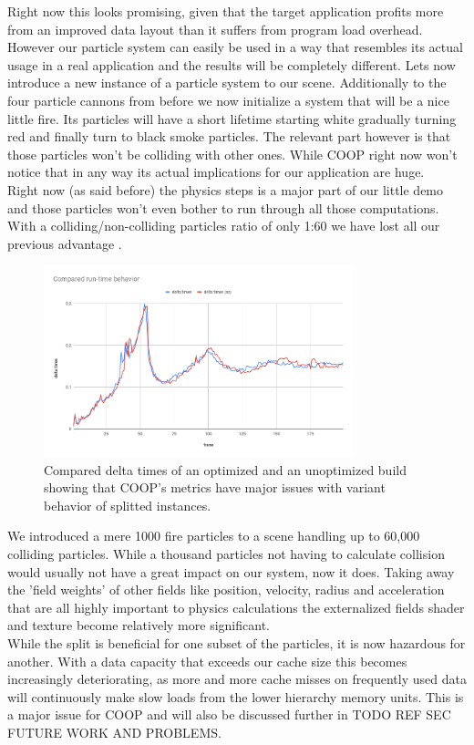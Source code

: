 Right now this looks promising, given that the target application profits more from an improved data layout than it suffers from program load overhead. However our particle system can easily be used in a way that resembles its actual usage in a real application and the results will be completely different. Lets now introduce a new instance of a particle system to our scene. Additionally to the four particle cannons from before we now initialize a system that will be a nice little fire. Its particles will have a short lifetime starting white gradually turning red and finally turn to black smoke particles. The relevant part however is that those particles won't be colliding with other ones. While COOP right now won't notice that in any way its actual implications for our application are huge.\\
Right now (as said before) the physics steps is a major part of our little demo and those particles won't even bother to run through all those computations. With a colliding/non-colliding particles ratio of only 1:60 we have lost all our previous advantage .
\begin{figure}[!htbp]
	\centering
	\includegraphics[width=0.8\textwidth,height=0.6\textwidth]{PICs/delta_times_fire}
	\caption{Compared delta times of an optimized and an unoptimized build showing that COOP's metrics have major issues with variant behavior of splitted instances.}
	\label{delta_times_fire}
\end{figure}
We introduced a mere 1000 fire particles to a scene handling up to 60,000 colliding particles. While a thousand particles not having to calculate collision would usually not have a great impact on our system, now it does. Taking away the 'field weights' of other fields like position, velocity, radius and acceleration that are all highly important to physics calculations the externalized fields shader and texture become relatively more significant.\\
While the split is beneficial for one subset of the particles, it is now hazardous for another. With a data capacity that exceeds our cache size this becomes increasingly deteriorating, as more and more cache misses on frequently used data will continuously make slow loads from the lower hierarchy memory units. This is a major issue for COOP and will also be discussed further in TODO REF SEC FUTURE WORK AND PROBLEMS.





